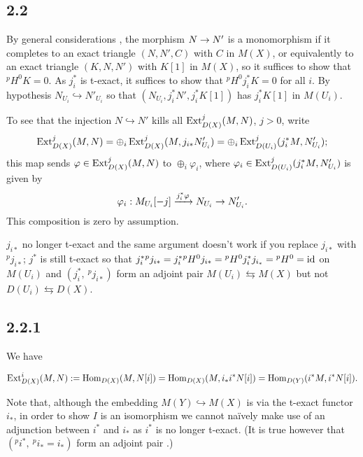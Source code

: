 \documentclass[deligne.tex]{subfiles}
\begin{document}
\subsection*{2.2}
By general considerations \cite[1.2]{BBD}, the morphism $N\rightarrow N'$ is a 
monomorphism if it completes to an exact triangle $(N,N',C)$ with $C$ 
in $M(X)$, or equivalently to an exact triangle $(K,N,N')$ with $K[1]$ in
$M(X)$, so it suffices to show that $^pH^0K=0$. As $j_i^*$ is t-exact, it
suffices to show that $^pH^0j_i^*K=0$ for all $i$.
By hypothesis $N_{U_i}\hookrightarrow N'_{U_i}$ so that
$(N_{U_i},j_i^*N',j_i^*K[1])$ has $j_i^*K[1]$ in $M(U_i)$.

To see that the injection $N\hookrightarrow N'$ kills all
$\operatorname{Ext}^j_{D(X)}(M,N)$, $j>0$, write
\begin{equation*}
	\operatorname{Ext}^j_{D(X)}(M,N)=\oplus_i\operatorname{Ext}^j_{D(X)}(M,j_{i*}N'_{U_i})
	=\oplus_i\operatorname{Ext}^j_{D(U_i)}(j_i^*M,N'_{U_i});
\end{equation*}
this map sends $\varphi\in\operatorname{Ext}^j_{D(X)}(M,N)$ to 
$\oplus_i\varphi_i$, where $\varphi_i\in\operatorname{Ext}^j_{D(U_i)}(j_i^*M,N'_{U_i})$ is
given by
\begin{equation*}
	\varphi_i:M_{U_i}[-j]\xrightarrow{j_i^*\varphi}N_{U_i}\rightarrow N'_{U_i}.
\end{equation*}
This composition is zero by assumption.
\begin{perv}
	$j_{i*}$ no longer t-exact and the same argument doesn't work if you
	replace $j_{i*}$ with $^pj_{i*}$; $j^*$ is still t-exact so that
	$j_i^*{^pj_{i*}}=j_i^*{^pH^0}j_{i*}={^pH^0}j_i^*j_{i_*}={^pH^0}=\operatorname{id}$
	on $M(U_i)$ and $(j_i^*,\ ^pj_{i*})$ form an adjoint pair
	$M(U_i)\leftrightarrows M(X)$ but not $D(U_i)\leftrightarrows D(X)$.
\end{perv}
\subsection*{2.2.1}
We have
\begin{ceqn}\begin{equation*}
	\operatorname{Ext}^i_{D(X)}(M,N):=\operatorname{Hom}_{D(X)}(M,N[i])
	=\operatorname{Hom}_{D(X)}(M,i_*i^*N[i])
	=\operatorname{Hom}_{D(Y)}(i^*M,i^*N[i]).
\end{equation*}\end{ceqn}
Note that, although the embedding $M(Y)\hookrightarrow M(X)$ is via the
t-exact functor $i_*$, in order to show $I$ is an isomorphism we cannot 
naïvely make use of an adjunction between $i^*$ and $i_*$ as $i^*$ is no
longer t-exact. (It is true however that $(^pi^*,\ ^pi_*=i_*)$ form an
adjoint pair \cite[1.4.16]{BBD}.)
\end{document}
